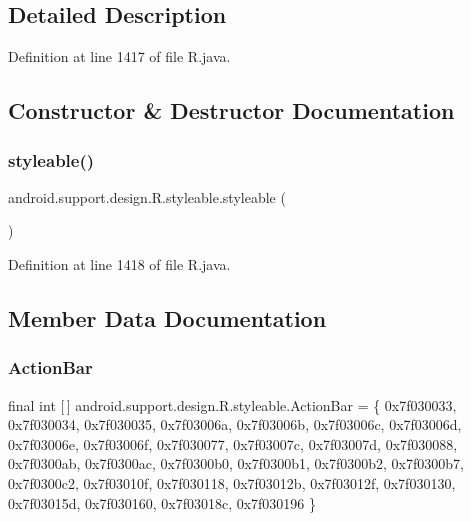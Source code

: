 \subsection{Detailed Description}


Definition at line 1417 of file R.\+java.



\subsection{Constructor \& Destructor Documentation}
\mbox{\label{classandroid_1_1support_1_1design_1_1_r_1_1styleable_a462dbfacb7fa5a21df9e1e562f6ac09e}} 
\subsubsection{\texorpdfstring{styleable()}{styleable()}}
{\footnotesize\ttfamily android.\+support.\+design.\+R.\+styleable.\+styleable (\begin{DoxyParamCaption}{ }\end{DoxyParamCaption})\hspace{0.3cm}{\ttfamily [private]}}



Definition at line 1418 of file R.\+java.


\begin{DoxyCode}{0}

\end{DoxyCode}


\subsection{Member Data Documentation}
\mbox{\label{classandroid_1_1support_1_1design_1_1_r_1_1styleable_ab795220a96557d11f8c21359b95bed82}} 
\subsubsection{\texorpdfstring{ActionBar}{ActionBar}}
{\footnotesize\ttfamily final int \mbox{[}$\,$\mbox{]} android.\+support.\+design.\+R.\+styleable.\+Action\+Bar = \{ 0x7f030033, 0x7f030034, 0x7f030035, 0x7f03006a, 0x7f03006b, 0x7f03006c, 0x7f03006d, 0x7f03006e, 0x7f03006f, 0x7f030077, 0x7f03007c, 0x7f03007d, 0x7f030088, 0x7f0300ab, 0x7f0300ac, 0x7f0300b0, 0x7f0300b1, 0x7f0300b2, 0x7f0300b7, 0x7f0300c2, 0x7f03010f, 0x7f030118, 0x7f03012b, 0x7f03012f, 0x7f030130, 0x7f03015d, 0x7f030160, 0x7f03018c, 0x7f030196 \}\hspace{0.3cm}{\ttfamily [static]}}



